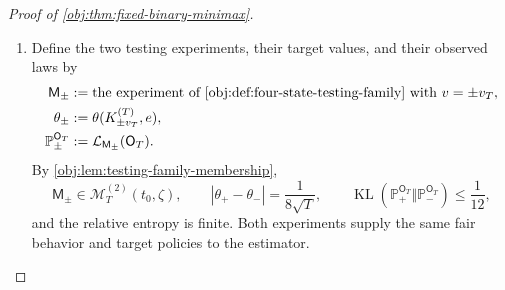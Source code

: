 \begin{proof}[Proof of \cref{obj:thm:fixed-binary-minimax}]
\begin{enumerate}
\item Define the two testing experiments, their target values, and their observed laws by
\[
\begin{aligned}
\mathsf M_\pm
&:=\text{the experiment of \cref{obj:def:four-state-testing-family}
with }v=\pm v_T,\\
\theta_\pm&:=\theta(K_{\pm v_T}^{(T)},e),\\
\mathbb P_\pm^{\mathsf O_T}
&:=\mathcal L_{\mathsf M_\pm}(\mathsf O_T).
\end{aligned}
\]
By \cref{obj:lem:testing-family-membership},
\[
\mathsf M_\pm\in\mathcal M_T^{(2)}(t_0,\zeta),
\qquad
|\theta_+-\theta_-|=\frac1{8\sqrt T},
\qquad
\operatorname{KL}\!\left(
\mathbb P_+^{\mathsf O_T}\Vert\mathbb P_-^{\mathsf O_T}
\right)\leq\frac1{12},
\]
and the relative entropy is finite. Both experiments supply the same fair behavior and target policies to the estimator.


\end{enumerate}
\end{proof}
